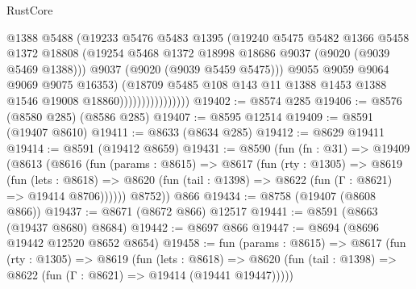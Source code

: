 \begin{lexlean}{RustCore}
\begin{coremodule}
                                  @1388
                                  @5488
                                  (@19233
                                    @5476
                                    @5483
                                    @1395
                                    (@19240
                                      @5475
                                      @5482
                                      @1366
                                      @5458
                                      @1372
                                      @18808
                                      (@19254
                                        @5468
                                        @1372
                                        @18998
                                        @18686
                                        @9037
                                        (@9020 (@9039 @5469 @1388)))
                                      @9037
                                      (@9020 (@9039 @5459 @5475)))
                                    @9055
                                    @9059
                                    @9064
                                    @9069
                                    @9075
                                    @16353)
                                  (@18709
                                    @5485
                                    @108
                                    @143
                                    @11
                                    @1388
                                    @1453
                                    @1388
                                    @1546
                                    @19008
                                    @18860))))))))))))))))
@19402 := @8574 @285
@19406 := @8576 (@8580 @285) (@8586 @285)
@19407 := @8595 @12514
@19409 := @8591 (@19407 @8610)
@19411 := @8633 (@8634 @285)
@19412 := @8629 @19411
@19414 := @8591 (@19412 @8659)
@19431 := @8590
    (fun (fn : @31) =>
    @19409
      (@8613
        (@8616
          (fun (params : @8615) =>
          @8617
            (fun (rty : @1305) =>
            @8619
              (fun (lets : @8618) =>
              @8620 (fun (tail : @1398) => @8622 (fun (Γ : @8621) => @19414 @8706))))))
        @8752))
    @866
@19434 := @8758 (@19407 (@8608 @866))
@19437 := @8671 (@8672 @866) @12517
@19441 := @8591 (@8663 (@19437 @8680) @8684)
@19442 := @8697 @866
@19447 := @8694 (@8696 @19442 @12520 @8652 @8654)
@19458 := fun (params : @8615) =>
  @8617
    (fun (rty : @1305) =>
    @8619
      (fun (lets : @8618) =>
      @8620 (fun (tail : @1398) => @8622 (fun (Γ : @8621) => @19414 (@19441 @19447)))))

\end{coremodule}
\end{lexlean}
